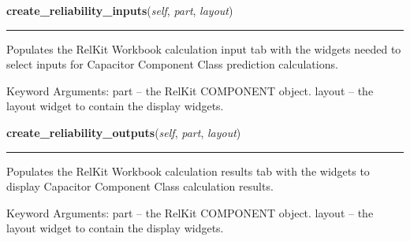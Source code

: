     \label{reliafree:capacitors:capacitor:Capacitor:create_reliability_inputs}

    \vspace{0.5ex}

\hspace{.8\funcindent}\begin{boxedminipage}{\funcwidth}

    \raggedright \textbf{create\_reliability\_inputs}(\textit{self}, \textit{part}, \textit{layout})

    \vspace{-1.5ex}

    \rule{\textwidth}{0.5\fboxrule}
\setlength{\parskip}{2ex}
    Populates the RelKit Workbook calculation input tab with the widgets
    needed to select inputs for Capacitor Component Class prediction 
    calculations.

    Keyword Arguments: part   -- the RelKit COMPONENT object. layout -- 
    the layout widget to contain the display widgets.

\setlength{\parskip}{1ex}
    \end{boxedminipage}

    \label{reliafree:capacitors:capacitor:Capacitor:create_reliability_outputs}

    \vspace{0.5ex}

\hspace{.8\funcindent}\begin{boxedminipage}{\funcwidth}

    \raggedright \textbf{create\_reliability\_outputs}(\textit{self}, \textit{part}, \textit{layout})

    \vspace{-1.5ex}

    \rule{\textwidth}{0.5\fboxrule}
\setlength{\parskip}{2ex}
    Populates the RelKit Workbook calculation results tab with the 
    widgets to display Capacitor Component Class calculation results.

    Keyword Arguments: part   -- the RelKit COMPONENT object. layout -- 
    the layout widget to contain the display widgets.

\setlength{\parskip}{1ex}
    \end{boxedminipage}

